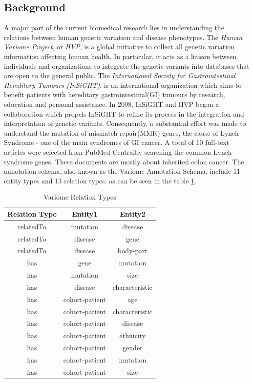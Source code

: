 \subsection{Background}
A major part of the current biomedical research lies in understanding the relations between human genetic variation and disease phenotypes. The \emph{Human Variome Project}, or \emph{HVP}, is a global initiative to collect all genetic variation information affecting human health\cite{ring2006human}. In particular, it acts as a liaison between individuals and organizations to integrate the genetic variants into databases that are open to the general public\cite{verspoor2013annotating}. The \emph{International Society for Gastrointestinal Hereditary Tumours (InSiGHT)}, is an international organization which aims to benefit patients with hereditary gastrointestinal(GI) tumours by research, education and personal assistance. In 2008, InSiGHT and HVP began a collaboration which propels InSiGHT to refine its process in the integration and interpretation of genetic variants. Consequently, a substantial effort was made to understand the mutation of mismatch repair(MMR) genes, the cause of Lynch Syndrome - one of the main syndromes of GI cancer\cite{silva2009mismatch}. A total of 10 full-text articles were selected from PubMed Central\textregistered  by searching the common Lynch syndrome genes. These documents are mostly about inherited colon cancer. The annotation schema, also known as the Variome Annotation Schema\cite{verspoor2013annotating}, include 11 entity types and 13 relation types. as can be seen in the table \ref{table:Variome_Relations}.\newline \newline
\begin{table}
	\caption{Variome Relation Types}
	\centering
	\label{table:Variome_Relations}
	\begin{tabular}{|c | c |c  |}
		\hline 
		{Relation Type} 
		& Entity1 & Entity2\\ 
		\hline
		relatedTo  & mutation & disease \\
		relatedTo & disease & gene\\
		relatedTo & disease & body-part\\
		\hline 
		has     & gene & mutation\\
		has     & mutation & size\\
		has     & disease & characteristic\\
		has     & cohort-patient & age\\
		has     & cohort-patient & characteristic\\
		has     & cohort-patient & disease\\
		has     & cohort-patient & ethnicity\\
		has     & cohort-patient & gender\\
		has     & cohort-patient & mutation\\
		has     & cohort-patient & size \\
		\hline 
	\end{tabular}
\end{table}
